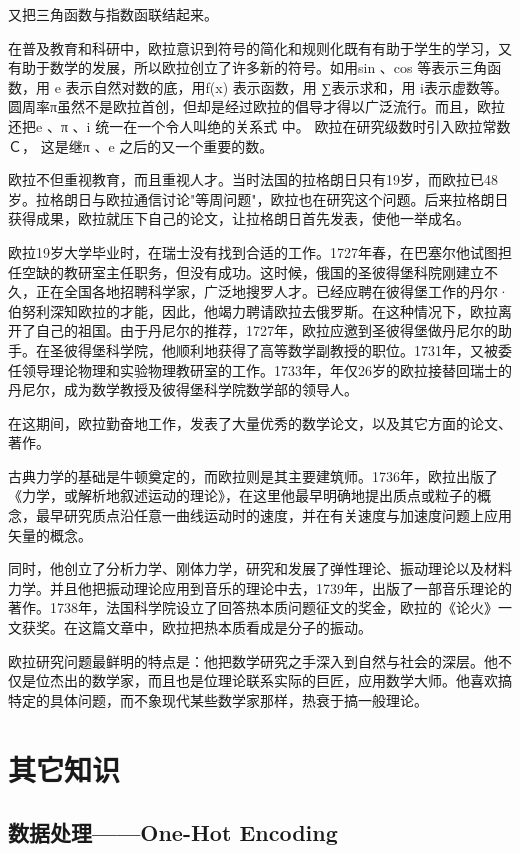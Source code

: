\documentclass[UTF8]{ctexart}
\begin{document}
又把三角函数与指数函联结起来。

在普及教育和科研中，欧拉意识到符号的简化和规则化既有有助于学生的学习，又有助于数学的发展，所以欧拉创立了许多新的符号。如用sin 、cos 等表示三角函数，用 e 表示自然对数的底，用f(x) 表示函数，用 ∑表示求和，用 i表示虚数等。圆周率π虽然不是欧拉首创，但却是经过欧拉的倡导才得以广泛流行。而且，欧拉还把e 、π 、i 统一在一个令人叫绝的关系式 中。 欧拉在研究级数时引入欧拉常数Ｃ， 这是继π 、e 之后的又一个重要的数。

欧拉不但重视教育，而且重视人才。当时法国的拉格朗日只有19岁，而欧拉已48岁。拉格朗日与欧拉通信讨论"等周问题"，欧拉也在研究这个问题。后来拉格朗日获得成果，欧拉就压下自己的论文，让拉格朗日首先发表，使他一举成名。

欧拉19岁大学毕业时，在瑞士没有找到合适的工作。1727年春，在巴塞尔他试图担任空缺的教研室主任职务，但没有成功。这时候，俄国的圣彼得堡科院刚建立不久，正在全国各地招聘科学家，广泛地搜罗人才。已经应聘在彼得堡工作的丹尔·伯努利深知欧拉的才能，因此，他竭力聘请欧拉去俄罗斯。在这种情况下，欧拉离开了自己的祖国。由于丹尼尔的推荐，1727年，欧拉应邀到圣彼得堡做丹尼尔的助手。在圣彼得堡科学院，他顺利地获得了高等数学副教授的职位。1731年，又被委任领导理论物理和实验物理教研室的工作。1733年，年仅26岁的欧拉接替回瑞士的丹尼尔，成为数学教授及彼得堡科学院数学部的领导人。

在这期间，欧拉勤奋地工作，发表了大量优秀的数学论文，以及其它方面的论文、著作。

古典力学的基础是牛顿奠定的，而欧拉则是其主要建筑师。1736年，欧拉出版了《力学，或解析地叙述运动的理论》，在这里他最早明确地提出质点或粒子的概念，最早研究质点沿任意一曲线运动时的速度，并在有关速度与加速度问题上应用矢量的概念。

同时，他创立了分析力学、刚体力学，研究和发展了弹性理论、振动理论以及材料力学。并且他把振动理论应用到音乐的理论中去，1739年，出版了一部音乐理论的著作。1738年，法国科学院设立了回答热本质问题征文的奖金，欧拉的《论火》一文获奖。在这篇文章中，欧拉把热本质看成是分子的振动。

欧拉研究问题最鲜明的特点是：他把数学研究之手深入到自然与社会的深层。他不仅是位杰出的数学家，而且也是位理论联系实际的巨匠，应用数学大师。他喜欢搞特定的具体问题，而不象现代某些数学家那样，热衰于搞一般理论。

\section{其它知识}

\subsection{数据处理——One-Hot Encoding}
\end{document}
